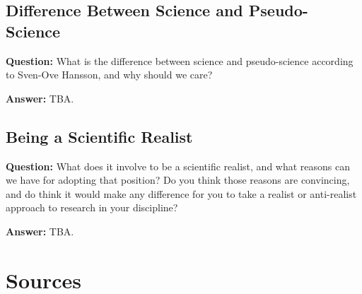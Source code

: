 \documentclass[11pt]{scrartcl}
\begin{document}
\subsection{Difference Between Science and Pseudo-Science}

\textbf{Question:} What is the difference between science and pseudo-science according to Sven-Ove Hansson, and why should we care?

\bigbreak

\textbf{Answer:} TBA.

\subsection{Being a Scientific Realist}

\textbf{Question:} What does it involve to be a scientific realist, and what reasons can we have for adopting that position? Do you think those reasons are convincing, and do think it would make any difference for you to take a realist or anti-realist approach to research in your discipline?

\bigbreak

\textbf{Answer:} TBA.

\section{Sources}



\end{document}
